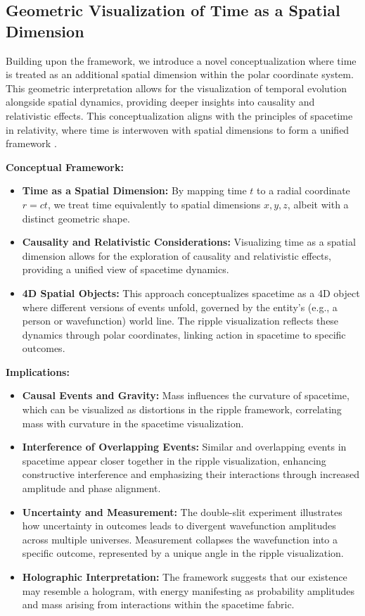 \documentclass[12pt]{article}
\begin{document}
\subsection{Geometric Visualization of Time as a Spatial Dimension}
Building upon the framework, we introduce a novel conceptualization where time is treated as an additional spatial dimension within the polar coordinate system. This geometric interpretation allows for the visualization of temporal evolution alongside spatial dynamics, providing deeper insights into causality and relativistic effects. This conceptualization aligns with the principles of spacetime in relativity, where time is interwoven with spatial dimensions to form a unified framework \cite{einstein1905}.

\textbf{Conceptual Framework:}
\begin{itemize}
    \item \textbf{Time as a Spatial Dimension:} By mapping time \(t\) to a radial coordinate \(r = ct\), we treat time equivalently to spatial dimensions \(x, y, z\), albeit with a distinct geometric shape.
    \item \textbf{Causality and Relativistic Considerations:} Visualizing time as a spatial dimension allows for the exploration of causality and relativistic effects, providing a unified view of spacetime dynamics.
    \item \textbf{4D Spatial Objects:} This approach conceptualizes spacetime as a 4D object where different versions of events unfold, governed by the entity's (e.g., a person or wavefunction) world line. The ripple visualization reflects these dynamics through polar coordinates, linking action in spacetime to specific outcomes.
\end{itemize}

\textbf{Implications:}
\begin{itemize}
    \item \textbf{Causal Events and Gravity:} Mass influences the curvature of spacetime, which can be visualized as distortions in the ripple framework, correlating mass with curvature in the spacetime visualization.
    \item \textbf{Interference of Overlapping Events:} Similar and overlapping events in spacetime appear closer together in the ripple visualization, enhancing constructive interference and emphasizing their interactions through increased amplitude and phase alignment.
    \item \textbf{Uncertainty and Measurement:} The double-slit experiment illustrates how uncertainty in outcomes leads to divergent wavefunction amplitudes across multiple universes. Measurement collapses the wavefunction into a specific outcome, represented by a unique angle in the ripple visualization.
    \item \textbf{Holographic Interpretation:} The framework suggests that our existence may resemble a hologram, with energy manifesting as probability amplitudes and mass arising from interactions within the spacetime fabric.
\end{itemize}
\end{document}
